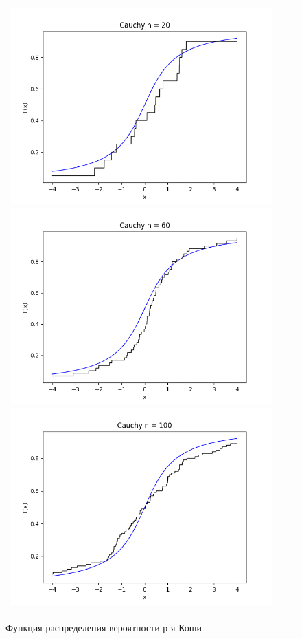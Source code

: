 \begin{figure}[H]
	\begin{tabular}{ccc}
		\includegraphics[scale=0.33]{cauchy_F20.png}
		\includegraphics[scale=0.33]{cauchy_F60.png}
		\includegraphics[scale=0.33]{cauchy_F100.png}
	\end{tabular}
	\caption{Функция распределения вероятности р-я Коши}
\end{figure}

